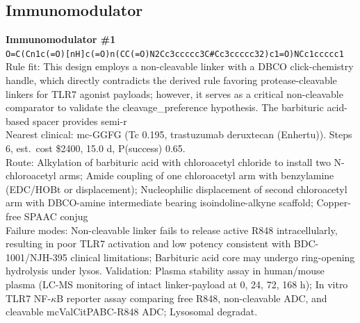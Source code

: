 \documentclass[10pt]{article}
\begin{document}
\subsection{Immunomodulator}
\noindent\textbf{Immunomodulator \#1} \\ \texttt{O=C(Cn1c(=O)[nH]c(=O)n(CC(=O)N2Cc3ccccc3C\#Cc3ccccc32)c1=O)NCc1ccccc1} \\ Rule fit: This design employs a non-cleavable linker with a DBCO click-chemistry handle, which directly contradicts the derived rule favoring protease-cleavable linkers for TLR7 agonist payloads; however, it serves as a critical non-cleavable comparator to validate the cleavage\_preference hypothesis. The barbituric acid-based spacer provides semi-r \\ Nearest clinical: mc-GGFG (Tc 0.195, trastuzumab deruxtecan (Enhertu)). Steps 6, est.\ cost \$2400, 15.0 d, P(success) 0.65. \\ Route: Alkylation of barbituric acid with chloroacetyl chloride to install two N-chloroacetyl arms; Amide coupling of one chloroacetyl arm with benzylamine (EDC/HOBt or displacement); Nucleophilic displacement of second chloroacetyl arm with DBCO-amine intermediate bearing isoindoline-alkyne scaffold; Copper-free SPAAC conjug \\ Failure modes: Non-cleavable linker fails to release active R848 intracellularly, resulting in poor TLR7 activation and low potency consistent with BDC-1001/NJH-395 clinical limitations; Barbituric acid core may undergo ring-opening hydrolysis under lysos. Validation: Plasma stability assay in human/mouse plasma (LC-MS monitoring of intact linker-payload at 0, 24, 72, 168 h); In vitro TLR7 NF-$\kappa$B reporter assay comparing free R848, non-cleavable ADC, and cleavable mcValCitPABC-R848 ADC; Lysosomal degradat. \\[0.4em]
\end{document}
